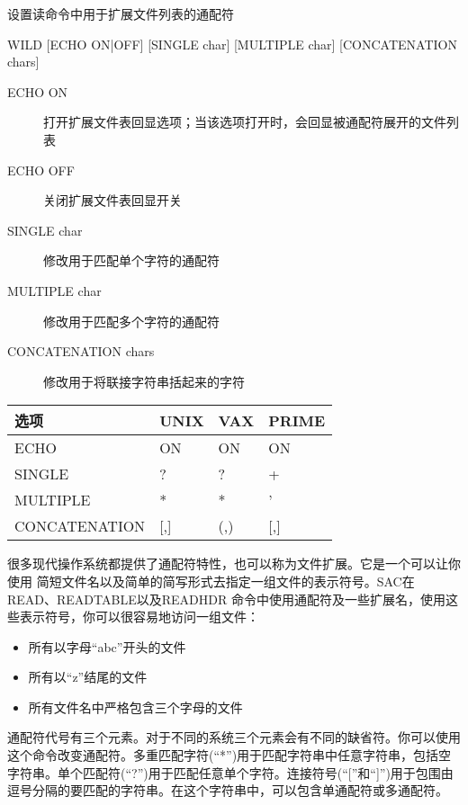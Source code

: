 \label{cmd:wild}

设置读命令中用于扩展文件列表的通配符

\begin{SACSTX}
WILD [ECHO ON|OFF] [SINGLE char] [MULTIPLE char] [CONCATENATION chars]
\end{SACSTX}

\begin{description}
\item [ECHO ON] 打开扩展文件表回显选项；当该选项打开时，会回显被通配符展开的文件列表
\item [ECHO OFF] 关闭扩展文件表回显开关
\item [SINGLE char] 修改用于匹配单个字符的通配符
\item [MULTIPLE char] 修改用于匹配多个字符的通配符
\item [CONCATENATION chars] 修改用于将联接字符串括起来的字符
\end{description}

\begin{center}
\begin{tabular}{llll}
\toprule
选项	&	UNIX	&	VAX		&	PRIME	\\
\midrule
ECHO	&	ON 		&	ON 		&	ON		\\
SINGLE  &	?  		&	?  		&	+		\\
MULTIPLE&	* 		&	* 		&	'		\\
CONCATENATION& [,] & 	(,)  	&	[,]		\\
\bottomrule
\end{tabular}
\end{center}

很多现代操作系统都提供了通配符特性，也可以称为文件扩展。它是一个可以让你使用
简短文件名以及简单的简写形式去指定一组文件的表示符号。SAC在READ、READTABLE以及READHDR
命令中使用通配符及一些扩展名，使用这些表示符号，你可以很容易地访问一组文件：
\begin{itemize}
\item 所有以字母``abc''开头的文件
\item 所有以``z''结尾的文件
\item 所有文件名中严格包含三个字母的文件
\end{itemize}

通配符代号有三个元素。对于不同的系统三个元素会有不同的缺省符。你可以使用这个命令改变通配符。多重匹配字符(``*'')用于匹配字符串中任意字符串，包括空字符串。单个匹配符(``?'')用于匹配任意单个字符。连接符号(``[''和``]'')用于包围由逗号分隔的要匹配的字符串。在这个字符串中，可以包含单通配符或多通配符。

